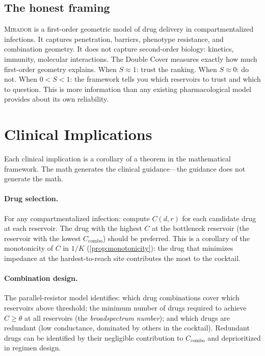 \documentclass[11pt]{article}
\theoremstyle{plain}
\theoremstyle{definition}
\newcommand{\mirador}{\textsc{Mirador}}
\newcommand{\Ccombo}{C_{\mathrm{combo}}}
\begin{document}
\subsection{The honest framing}
\label{sec:honest}

\mirador{} is a first-order geometric model of drug delivery in
compartmentalized infections. It captures penetration, barriers,
phenotype resistance, and combination geometry. It does not capture
second-order biology: kinetics, immunity, molecular interactions.
The Double Cover measures exactly how much first-order geometry
explains. When $S \approx 1$: trust the ranking. When $S \approx 0$:
do not. When $0 < S < 1$: the framework tells you which reservoirs
to trust and which to question. This is more information than any
existing pharmacological model provides about its own reliability.

\section{Clinical Implications}
\label{sec:clinical}

Each clinical implication is a corollary of a theorem in the
mathematical framework. The math generates the clinical
guidance---the guidance does not generate the math.

\paragraph{Drug selection.}
For any compartmentalized infection: compute $C(d, r)$ for each
candidate drug at each reservoir. The drug with the highest $C$ at
the bottleneck reservoir (the reservoir with the lowest $\Ccombo$)
should be preferred. This is a corollary of the monotonicity of
$C$ in $1/K$ (\cref{prop:monotonicity}): the drug that minimizes
impedance at the hardest-to-reach site contributes the most to
the cocktail.

\paragraph{Combination design.}
The parallel-resistor model identifies: which drug combinations
cover which reservoirs above threshold; the minimum number of drugs
required to achieve $C \geq \theta$ at all reservoirs (the
\emph{broadspectrum number}); and which drugs are redundant
(low conductance, dominated by others in the cocktail). Redundant
drugs can be identified by their negligible contribution to
$\Ccombo$ and deprioritized in regimen design.
\end{document}
